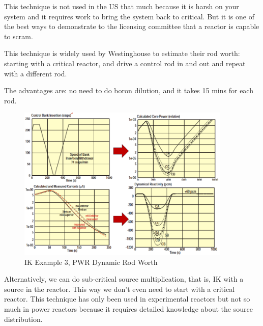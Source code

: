 \documentclass{school-22.211-notes}
\begin{document}
This technique is not used in the US that much because it is harsh on your system and it requires work to bring the system back to critical. But it is one of the best ways to demonstrate to the licensing committee that a reactor is capable to scram.  

 \label{dynamic-rod-worth}
This technique is widely used by Westinghouse to estimate their rod worth: starting with a critical reactor, and drive a control rod in and out and repeat with a different rod. 

The advantages are: no need to do boron dilution, and it takes 15 mins for each rod. 
\begin{figure}[ht]
  \centering
  \includegraphics[width=4in]{images/pke/ik-ex3b.png}
  \caption{IK Example 3, PWR Dynamic Rod Worth} \label{ik-ex3}
\end{figure}

Alternatively, we can do sub-critical source multiplication, that is, IK with a source in the reactor. This way we don't even need to start with a critical reactor. This technique has only been used in experimental reactors but not so much in power reactors because it requires detailed knowledge about the source distribution. 
\end{document}

